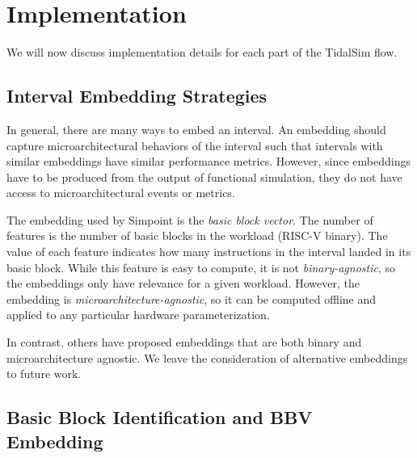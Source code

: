 \documentclass[sigplan,nonacm,10pt]{acmart}
\begin{document}
\section{Implementation}

We will now discuss implementation details for each part of the TidalSim flow.

\subsection{Interval Embedding Strategies}

In general, there are many ways to embed an interval.
An embedding should capture microarchitectural behaviors of the interval such that intervals with similar embeddings have similar performance metrics.
However, since embeddings have to be produced from the output of functional simulation, they do not have access to microarchitectural events or metrics.

The embedding used by Simpoint is the \textit{basic block vector}.
The number of features is the number of basic blocks in the workload (RISC-V binary).
The value of each feature indicates how many instructions in the interval landed in its basic block.
While this feature is easy to compute, it is not \textit{binary-agnostic}, so the embeddings only have relevance for a given workload.
However, the embedding is \textit{microarchitecture-agnostic}, so it can be computed offline and applied to any particular hardware parameterization.

In contrast, others have proposed embeddings that are both binary and microarchitecture agnostic\cite{nps}.
We leave the consideration of alternative embeddings to future work.


\subsection{Basic Block Identification and BBV Embedding}


\end{document}
